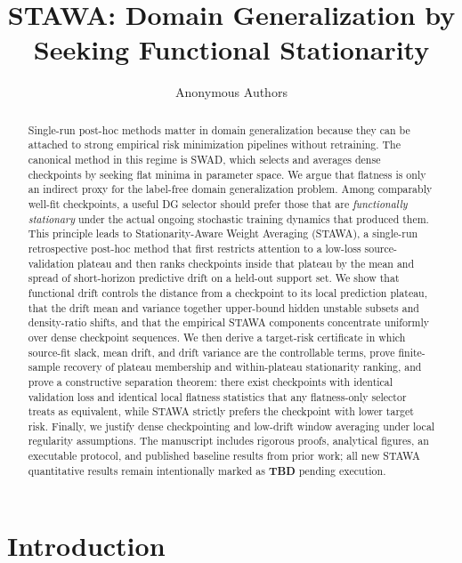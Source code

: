 \documentclass{article}
\title{STAWA: Domain Generalization by Seeking Functional Stationarity}
\author{Anonymous Authors}
\newcommand{\TBD}{\textbf{TBD}}
\newcommand{\stawa}{\textup{\textsc{STAWA}}}
\newcommand{\swad}{\textup{\textsc{SWAD}}}
\begin{document}
\maketitle

\begin{abstract}
Single-run post-hoc methods matter in domain generalization because they can be attached to strong empirical risk minimization pipelines without retraining. The canonical method in this regime is \swad, which selects and averages dense checkpoints by seeking flat minima in parameter space. We argue that flatness is only an indirect proxy for the label-free domain generalization problem. Among comparably well-fit checkpoints, a useful DG selector should prefer those that are \emph{functionally stationary} under the actual ongoing stochastic training dynamics that produced them. This principle leads to Stationarity-Aware Weight Averaging (\stawa), a single-run retrospective post-hoc method that first restricts attention to a low-loss source-validation plateau and then ranks checkpoints inside that plateau by the mean and spread of short-horizon predictive drift on a held-out support set. We show that functional drift controls the distance from a checkpoint to its local prediction plateau, that the drift mean and variance together upper-bound hidden unstable subsets and density-ratio shifts, and that the empirical \stawa{} components concentrate uniformly over dense checkpoint sequences. We then derive a target-risk certificate in which source-fit slack, mean drift, and drift variance are the controllable terms, prove finite-sample recovery of plateau membership and within-plateau stationarity ranking, and prove a constructive separation theorem: there exist checkpoints with identical validation loss and identical local flatness statistics that any flatness-only selector treats as equivalent, while \stawa{} strictly prefers the checkpoint with lower target risk. Finally, we justify dense checkpointing and low-drift window averaging under local regularity assumptions. The manuscript includes rigorous proofs, analytical figures, an executable protocol, and published baseline results from prior work; all new \stawa{} quantitative results remain intentionally marked as \TBD{} pending execution.
\end{abstract}

\section{Introduction}
\end{document}
